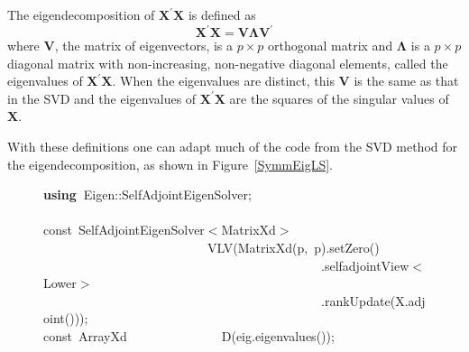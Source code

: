 \documentclass[shortnames,article]{jss}
\newcommand{\hlstd}[1]{\textcolor[rgb]{0,0,0}{#1}}
\newcommand{\hlopt}[1]{\textcolor[rgb]{0,0,0}{#1}}
\newcommand{\hlkwa}[1]{\textcolor[rgb]{0.61,0.13,0.93}{\bf{#1}}}
\newcommand{\hlkwb}[1]{\textcolor[rgb]{0.13,0.54,0.13}{#1}}
\newcommand{\hlkwd}[1]{\textcolor[rgb]{0,0,0}{#1}}
\begin{document}
The eigendecomposition of $\bm X^\prime\bm X$ is defined as
\begin{displaymath}
  \bm X^\prime\bm X=\bm V\bm\Lambda\bm V^\prime
\end{displaymath}
where $\bm V$, the matrix of eigenvectors, is a $p\times p$ orthogonal
matrix and $\bm\Lambda$ is a $p\times p$ diagonal matrix with
non-increasing, non-negative diagonal elements, called the eigenvalues
of $\bm X^\prime\bm X$.  When the eigenvalues are distinct, this $\bm
V$ is the same as that in the SVD and the eigenvalues of $\bm
X^\prime\bm X$ are the squares of the singular values of $\bm X$.

With these definitions one can adapt much of the code from the SVD
method for the eigendecomposition, as shown in Figure~\ref{SymmEigLS}.
\begin{figure}[htb]
    \noindent
    \ttfamily
    \hlstd{}\hlkwa{using\ }\hlstd{Eigen}\hlopt{::}\hlstd{SelfAdjointEigenSolver}\hlopt{;}\hspace*{\fill}\\
    \hlstd{}\hspace*{\fill}\\
    \hlkwb{const\ }\hlstd{SelfAdjointEigenSolver}\hlopt{$<$}\hlstd{MatrixXd}\hlopt{$>$}\hspace*{\fill}\\
    \hlstd{}\hlstd{\ \ \ \ \ \ \ \ \ \ \ \ \ \ \ \ \ \ \ \ \ \ \ \ \ \ }\hlstd{}\hlkwd{VLV}\hlstd{}\hlopt{(}\hlstd{}\hlkwd{MatrixXd}\hlstd{}\hlopt{(}\hlstd{p}\hlopt{,\ }\hlstd{p}\hlopt{).}\hlstd{}\hlkwd{setZero}\hlstd{}\hlopt{()}\hspace*{\fill}\\
    \hlstd{}\hlstd{\ \ \ \ \ \ \ \ \ \ \ \ \ \ \ \ \ \ \ \ \ \ \ \ \ \ \ \ \ \ \ \ \ \ \ \ \ \ \ \ \ \ \ \ }\hlstd{}\hlopt{.}\hlstd{selfadjointView}\hlopt{$<$}\hlstd{Lower}\hlopt{$>$}\hspace*{\fill}\\
    \hlstd{}\hlstd{\ \ \ \ \ \ \ \ \ \ \ \ \ \ \ \ \ \ \ \ \ \ \ \ \ \ \ \ \ \ \ \ \ \ \ \ \ \ \ \ \ \ \ \ }\hlstd{}\hlopt{.}\hlstd{}\hlkwd{rankUpdate}\hlstd{}\hlopt{(}\hlstd{X}\hlopt{.}\hlstd{}\hlkwd{adjoint}\hlstd{}\hlopt{()));}\hspace*{\fill}\\
    \hlstd{}\hlkwb{const\ }\hlstd{ArrayXd}\hlstd{\ \ \ \ \ \ \ \ \ \ \ \ \ \ \ }\hlstd{}\hlkwd{D}\hlstd{}\hlopt{(}\hlstd{eig}\hlopt{.}\hlstd{}\hlkwd{eigenvalues}\hlstd{}\hlopt{());}\hspace*{\fill}\\

\end{figure}
\end{document}
